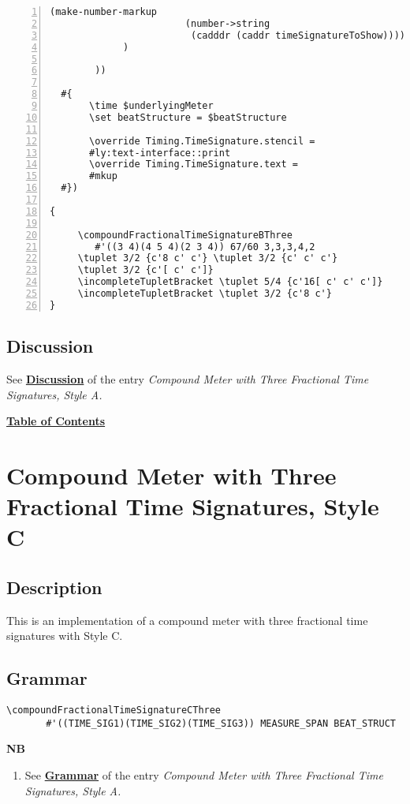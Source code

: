 \begin{Verbatim}[numbers=left,xleftmargin=5mm]
                       (make-number-markup
                        (number->string
                         (cadddr (caddr timeSignatureToShow)))))))))
             )

        ))

  #{
       \time $underlyingMeter
       \set beatStructure = $beatStructure

       \override Timing.TimeSignature.stencil =
       #ly:text-interface::print
       \override Timing.TimeSignature.text =
       #mkup
  #})

{

     \compoundFractionalTimeSignatureBThree 
     	#'((3 4)(4 5 4)(2 3 4)) 67/60 3,3,3,4,2
     \tuplet 3/2 {c'8 c' c'} \tuplet 3/2 {c' c' c'}
     \tuplet 3/2 {c'[ c' c']}
     \incompleteTupletBracket \tuplet 5/4 {c'16[ c' c' c']}
     \incompleteTupletBracket \tuplet 3/2 {c'8 c'}
}
\end{Verbatim}


\subsection{Discussion}
See \hyperref[sec:compoundfractionalmeter_discussion_two]{\textbf{Discussion}} of the entry \textit{Compound Meter with Three Fractional Time Signatures, Style A.}


\hyperref[sec:toc]{\textbf{Table of Contents}}

\vfill \break








\section {Compound Meter with Three Fractional Time Signatures, Style C}

\hfill
{}
\hfill

\subsection{Description}
This is an implementation of a compound meter with three fractional time signatures with Style C.  

\subsection{Grammar}
\begin{verbatim}
\compoundFractionalTimeSignatureCThree
       #'((TIME_SIG1)(TIME_SIG2)(TIME_SIG3)) MEASURE_SPAN BEAT_STRUCT
\end{verbatim}
\textbf{NB}
\begin{enumerate}
\item See \hyperref[sec:compoundfractionalmeter_grammar]{\textbf{Grammar}} of the entry \textit{Compound Meter with Three Fractional Time Signatures, Style A.}
\end{enumerate}

